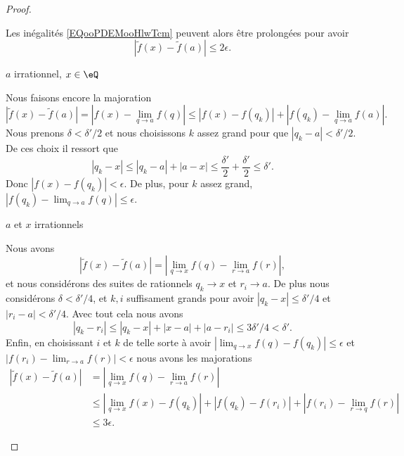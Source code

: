 \begin{proof}
\begin{subproof}
\begin{subproof}
                Les inégalités \eqref{EQooPDEMooHlwTcm} peuvent alors être prolongées pour avoir
                \begin{equation}
                    | \tilde f(x)-\tilde f(a) |\leq 2\epsilon.
                \end{equation}
                
            \item[\( a\) irrationnel, \( x\in \eQ\)]

                Nous faisons encore la majoration
                \begin{equation}
                    | \tilde f(x)-\tilde f(a) |=| f(x)-\lim_{q\to a} f(q) |\leq | f(x)-f(q_k) |+| f(q_k)-\lim_{q\to a} f(a) |.
                \end{equation}
                Nous prenons \( \delta<\delta'/2\) et nous choisissons \( k\) assez grand pour que \( | q_k-a |<\delta'/2\). De ces choix il ressort que
                \begin{equation}
                    | q_k-x |\leq | q_k-a |+| a-x |\leq \frac{ \delta' }{2}+\frac{ \delta' }{2}\leq \delta'.
                \end{equation}
                Donc \( | f(x)-f(q_k) |<\epsilon\). De plus, pour \( k\) assez grand, \( | f(q_k)-\lim_{q\to a} f(q) |\leq \epsilon\).

            \item[\( a\) et \( x\) irrationnels]

                Nous avons
                \begin{equation}
                    | \tilde f(x)-\tilde f(a) |=| \lim_{q\to x} f(q)-\lim_{r\to a} f(r) |,
                \end{equation}
                et nous considérons des suites de rationnels \( q_k\to x\) et \( r_i\to a\). De plus nous considérons \( \delta<\delta'/4\), et \( k,i\) suffisament grands pour avoir \( | q_k-x |\leq \delta'/4\) et \( | r_i-a |<\delta'/4\). Avec tout cela nous avons
                \begin{equation}
                    | q_k-r_i |\leq | q_k-x |+| x-a |+| a-r_i |\leq 3\delta'/4<\delta'.
                \end{equation}
                Enfin, en choisissant \( i\) et \( k\) de telle sorte à avoir \( | \lim_{q\to x} f(q)-f(q_k) |\leq \epsilon\) et \( | f(r_i)-\lim_{r\to a} f(r) |<\epsilon\) nous avons les majorations
                \begin{subequations}
                    \begin{align}
                        | \tilde f(x)-\tilde f(a) |&=| \lim_{q\to x} f(q)-\lim_{r\to a} f(r) |\\
                        &\leq | \lim_{q\to x} f(x)-f(q_k) |+| f(q_k)-f(r_i) |+| f(r_i)-\lim_{r\to q} f(r) |\\
                        &\leq 3\epsilon.
                    \end{align}
                \end{subequations}
        \end{subproof}


\end{subproof}
\end{proof}
